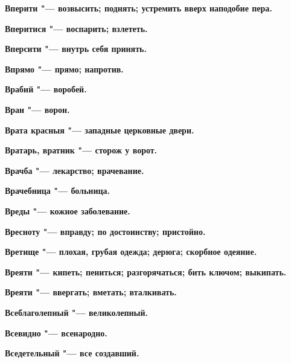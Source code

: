 \bfseries Вперити \normalfont{} "--- возвысить; поднять; устремить вверх наподобие пера. 




\bfseries Вперитися \normalfont{} "--- воспарить; взлететь. 




\bfseries Вперсити \normalfont{} "--- внутрь себя принять. 




\bfseries Впрямо \normalfont{} "--- прямо; напротив. 




\bfseries Врабий \normalfont{} "--- воробей. 




\bfseries Вран \normalfont{} "--- ворон. 




\bfseries Врата красныя \normalfont{} "--- западные церковные двери. 




\bfseries Вратарь, вратник \normalfont{} "--- сторож у ворот. 




\bfseries Врачба \normalfont{} "--- лекарство; врачевание. 




\bfseries Врачебница \normalfont{} "--- больница. 




\bfseries Вреды \normalfont{} "--- кожное заболевание. 




\bfseries Вресноту \normalfont{} "--- вправду; по достоинству; пристойно. 




\bfseries Вретище \normalfont{} "--- плохая, грубая одежда; дерюга; скорбное одеяние. 




\bfseries Вреяти \normalfont{} "--- кипеть; пениться; разгорячаться; бить ключом; выкипать. 




\bfseries Вреяти \normalfont{} "--- ввергать; вметать; вталкивать. 




\bfseries Всеблаголепный \normalfont{} "--- великолепный. 




\bfseries Всевидно \normalfont{} "--- всенародно. 




\bfseries Вседетельный \normalfont{} "--- все создавший. 




